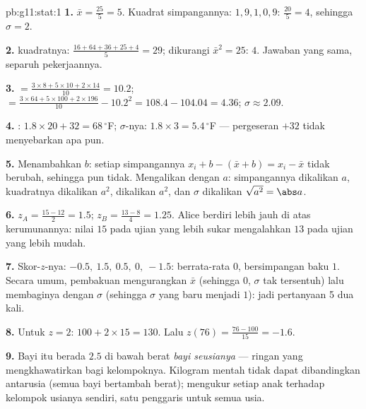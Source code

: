\begin{solution}{pb:g11:stat:1}
\textbf{1.}  $\bar x = \frac{25}{5} = 5$. Kuadrat
simpangannya: $1, 9, 1, 0, 9$:  $\frac{20}{5} = 4$, sehingga
$\sigma = 2$.

\textbf{2.}  kuadratnya:
$\frac{16 + 64 + 36 + 25 + 4}{5} = 29$; dikurangi
$\bar x^2 = 25$:  $4$. Jawaban yang sama, separuh pekerjaannya.

\textbf{3.}  $= \frac{3 \times 8 + 5 \times 10 + 2 \times
14}{10} = 10.2$;  $= \frac{3 \times 64 + 5 \times 100 +
2 \times 196}{10} - 10.2^2 = 108.4 - 104.04 = 4.36$;
$\sigma \approx 2.09$.

\textbf{4.} : $1.8 \times 20 + 32 = 68\,^\circ$F;
$\sigma$-nya: $1.8 \times 3 = 5.4\,^\circ$F --- pergeseran $+32$
tidak menyebarkan apa pun.

\textbf{5.} Menambahkan $b$: setiap simpangannya $x_i + b - (\bar x + b)
= x_i - \bar x$ tidak berubah, sehingga  pun tidak. Mengalikan
dengan $a$: simpangannya dikalikan $a$, kuadratnya dikalikan
$a^2$,  dikalikan $a^2$, dan $\sigma$ dikalikan
$\sqrt{a^2} = \abs a$.

\textbf{6.} $z_A = \frac{15 - 12}{2} = 1.5$;
$z_B = \frac{13 - 8}{4} = 1.25$. Alice berdiri lebih jauh di atas
kerumunannya: nilai $15$ pada ujian yang lebih sukar mengalahkan $13$ pada
ujian yang lebih mudah.

\textbf{7.} Skor-$z$-nya: $-0.5,\ 1.5,\ 0.5,\ 0,\ -1.5$: berrata-rata
$0$, bersimpangan baku $1$. Secara umum, pembakuan
mengurangkan $\bar x$ (sehingga  $0$, $\sigma$ tak tersentuh)
lalu membaginya dengan $\sigma$ (sehingga $\sigma$ yang baru menjadi
$1$): jadi pertanyaan 5 dua kali.

\textbf{8.} Untuk $z = 2$: $100 + 2 \times 15 = 130$. Lalu
$z(76) = \frac{76 - 100}{15} = -1.6$.

\textbf{9.} Bayi itu berada $2.5$  di bawah
 berat \emph{bayi seusianya} --- ringan yang mengkhawatirkan bagi
kelompoknya. Kilogram mentah tidak dapat dibandingkan antarusia (semua
bayi bertambah berat);  mengukur setiap anak terhadap kelompok
usianya sendiri, satu penggaris untuk semua usia.


\end{solution}
